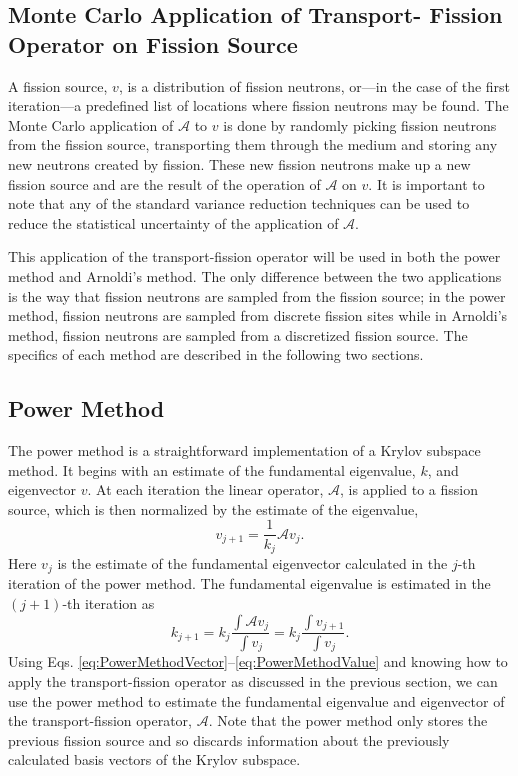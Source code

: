 \documentclass[12]{ansnse}
\newcommand{\A}{\ensuremath{\mathcal{A}}}
\begin{document}
\begin{doublespace}
\subsection{Monte Carlo Application of Transport- Fission Operator on Fission Source}\label{sec:AApplication}
A fission source, $v$, is a distribution of fission neutrons, or---in the case of the first iteration---a predefined list of locations where fission neutrons may be found.  The Monte Carlo application of \A{} to $v$ is done by randomly picking fission neutrons from the fission source, transporting them through the medium and storing any new neutrons created by fission.  These new fission neutrons make up a new fission source and are the result of the operation of \A{} on $v$.  It is important to note that any of the standard variance reduction techniques can be used to reduce the statistical uncertainty of the application of \A.  

This application of the transport-fission operator will be used in both the power method and Arnoldi's method.  The only difference between the two applications is the way that fission neutrons are sampled from the fission source; in the power method, fission neutrons are sampled from discrete fission sites while in Arnoldi's method, fission neutrons are sampled from a discretized fission source.  The specifics of each method are described in the following two sections.

\subsection{Power Method}\label{sec:PowerMethod}
The power method is a straightforward implementation of a Krylov subspace method.  It begins with an estimate of the fundamental eigenvalue, $k$, and eigenvector $v$.  At each iteration the linear operator, \A, is applied to a fission source, which is then normalized by the estimate of the eigenvalue,
\begin{equation}
    v_{j+1} = \frac{1}{k_j}\A v_j.
    \label{eq:PowerMethodVector}
\end{equation}
Here $v_{j}$ is the estimate of the fundamental eigenvector calculated in the \mbox{$j$-th} iteration of the power method.  The fundamental eigenvalue is estimated in the \mbox{$\left(j+1\right)$-th} iteration as
\begin{equation}
    k_{j+1} = k_j\frac{\int \A v_j}{\int v_j} = k_j \frac{\int v_{j+1}}{\int v_j}.
    \label{eq:PowerMethodValue}
\end{equation}
Using Eqs. \eqref{eq:PowerMethodVector}--\eqref{eq:PowerMethodValue} and knowing how to apply the transport-fission operator as discussed in the previous section, we can use the power method to estimate the fundamental eigenvalue and eigenvector of the transport-fission operator, \A.  Note that the power method only stores the previous fission source and so discards information about the previously calculated basis vectors of the Krylov subspace.


\end{doublespace}
\end{document}
